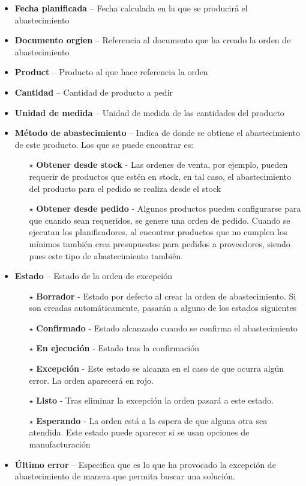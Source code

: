 \begin{itemize}
  \item \textbf{Fecha planificada} -- Fecha calculada en la que se producirá el abastecimiento
  \item \textbf{Documento orgien} -- Referencia al documento que ha creado la orden de abastecimiento
  \item \textbf{Product} -- Producto al que hace referencia la orden
  \item \textbf{Cantidad} -- Cantidad de producto a pedir
  \item \textbf{Unidad de medida} -- Unidad de medida de las cantidades del producto
  \item \textbf{Método de abastecimiento} -- Indica de donde se obtiene el abastecimiento de este producto. Los que se puede encontrar es:
    \begin{itemize}
       \item[$\star$] \textbf{Obtener desde stock} - Las ordenes de venta, por ejemplo, pueden requerir de productos que estén en stock, en tal
                                                    caso, el abastecimiento del producto para el pedido se realiza desde el stock
       \item[$\star$] \textbf{Obtener desde pedido} - Algunos productos pueden configurarse para que cuando sean requeridos, se genere una orden 
                                                    de pedido. Cuando se ejecutan los planificadores, al encontrar productos que no cumplen los
                                                    mínimos también crea presupuestos para pedidos a proveedores, siendo pues este tipo de
                                                    abastecimiento también.
    \end{itemize}
  \item \textbf{Estado} -- Estado de la orden de excepción
    \begin{itemize}
      \item[$\star$] \textbf{Borrador} - Estado por defecto al crear la orden de abastecimiento. Si son creadas automáticamente, pasarán a alguno
                                         de los estados siguientes
      \item[$\star$] \textbf{Confirmado} - Estado alcanzado cuando se confirma el abastecimiento
      \item[$\star$] \textbf{En ejecución} - Estado tras la confirmación
      \item[$\star$] \textbf{Excepción} - Este estado se alcanza en el caso de que ocurra algún error. La orden aparecerá en rojo.
      \item[$\star$] \textbf{Listo} - Tras eliminar la excepción la orden pasará a este estado.
      \item[$\star$] \textbf{Esperando} - La orden está a la espera de que alguna otra sea atendida. Este estado puede aparecer si se usan opciones
                                          de manufacturación
    \end{itemize}
  \item \textbf{Último error} -- Especifica que es lo que ha provocado la excepción de abastecimiento de manera que permita buscar una solución.
\end{itemize}

